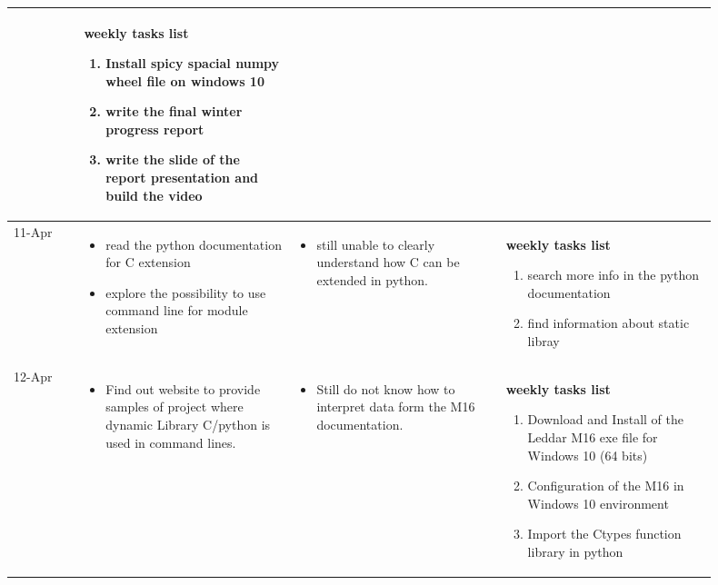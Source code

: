 \begin{longtable}{|l|p{0.3\linewidth}|p{0.3\linewidth}|p{0.3\linewidth}|}
			&
			\textbf{ weekly tasks list}
	\begin{enumerate}
	\item  Install spicy spacial numpy wheel file on windows 10
	\item write the final winter progress report 
	\item write the slide of the report presentation and build the video
	\
	\end{enumerate}

			\\\hline
			
					11-Apr	&
\begin{itemize}
\item read  the python documentation for C extension
\item explore the possibility to use command line for module extension
\end{itemize}
			&
\begin{itemize}
\item still unable to clearly understand how   C can be extended in python.  
\end{itemize}			
			
			&
			\textbf{ weekly tasks list}
	\begin{enumerate}
	\item  search more info in the python documentation
	\item  find information about static libray 
	\end{enumerate}

			\\\hline
			
					12-Apr	&
\begin{itemize}
\item Find out website to provide samples of project where dynamic Library C/python is used in command lines.
\end{itemize}
			&
\begin{itemize}
\item Still do not know how to interpret  data form the M16 documentation.  
\end{itemize}			
			
			&
			\textbf{ weekly tasks list}
	\begin{enumerate}
	\item  Download and Install of the Leddar M16 exe file for Windows 10 (64 bits)
	\item Configuration of the M16 in Windows 10 environment 
	\item Import the Ctypes function library in python  
	\
	\end{enumerate}


\end{longtable}
